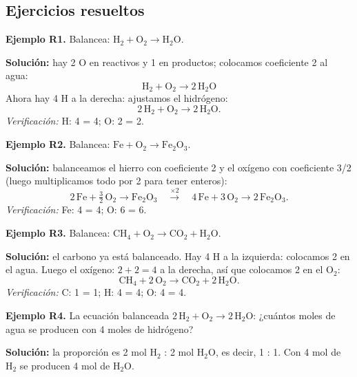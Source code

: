 \documentclass[12pt, letterpaper]{article}
\begin{document}
\subsection{Ejercicios resueltos}

\textbf{Ejemplo R1.} Balancea: $\text{H}_2 + \text{O}_2 \rightarrow \text{H}_2\text{O}$.

\begin{cuadrosolucion}
  \textbf{Solución:} hay 2 O en reactivos y 1 en productos; colocamos coeficiente 2 al agua:
  $$\text{H}_2 + \text{O}_2 \rightarrow 2\,\text{H}_2\text{O}$$
  Ahora hay 4 H a la derecha: ajustamos el hidrógeno:
  $$2\,\text{H}_2 + \text{O}_2 \rightarrow 2\,\text{H}_2\text{O}.$$
  \emph{Verificación:} H: 4 = 4; O: 2 = 2. \checkmark
\end{cuadrosolucion}
\newpage
\textbf{Ejemplo R2.} Balancea: $\text{Fe} + \text{O}_2 \rightarrow \text{Fe}_2\text{O}_3$.

\begin{cuadrosolucion}
  \textbf{Solución:} balanceamos el hierro con coeficiente 2 y el oxígeno con coeficiente 3/2 (luego multiplicamos todo por 2 para tener enteros):
  $$2\,\text{Fe} + \tfrac{3}{2}\,\text{O}_2 \rightarrow \text{Fe}_2\text{O}_3 \quad \xrightarrow{\times 2} \quad 4\,\text{Fe} + 3\,\text{O}_2 \rightarrow 2\,\text{Fe}_2\text{O}_3.$$
  \emph{Verificación:} Fe: 4 = 4; O: 6 = 6. \checkmark
\end{cuadrosolucion}

\textbf{Ejemplo R3.} Balancea: $\text{CH}_4 + \text{O}_2 \rightarrow \text{CO}_2 + \text{H}_2\text{O}$.

\begin{cuadrosolucion}
  \textbf{Solución:} el carbono ya está balanceado. Hay 4 H a la izquierda: colocamos 2 en el agua. Luego el oxígeno: $2 + 2 = 4$ a la derecha, así que colocamos 2 en el $\text{O}_2$:
  $$\text{CH}_4 + 2\,\text{O}_2 \rightarrow \text{CO}_2 + 2\,\text{H}_2\text{O}.$$
  \emph{Verificación:} C: 1 = 1; H: 4 = 4; O: 4 = 4. \checkmark
\end{cuadrosolucion}

\textbf{Ejemplo R4.} La ecuación balanceada $2\,\text{H}_2 + \text{O}_2 \rightarrow 2\,\text{H}_2\text{O}$: ¿cuántos moles de agua se producen con 4 moles de hidrógeno?

\begin{cuadrosolucion}
  \textbf{Solución:} la proporción es 2 mol $\text{H}_2$ : 2 mol $\text{H}_2\text{O}$, es decir, 1 : 1. Con 4 mol de $\text{H}_2$ se producen 4 mol de $\text{H}_2\text{O}$.
\end{cuadrosolucion}
\end{document}
